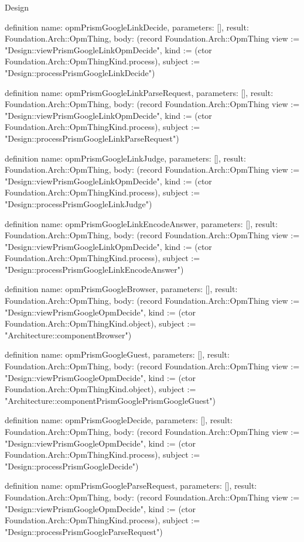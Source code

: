 \begin{lexlean}{Design}
\begin{semanticmodule}
definition{
  name: opmPrismGoogleLinkDecide,
  parameters: [],
  result: Foundation.Arch::OpmThing,
  body: (record Foundation.Arch::OpmThing {view := "Design::viewPrismGoogleLinkOpmDecide", kind := (ctor Foundation.Arch::OpmThingKind.process), subject := "Design::processPrismGoogleLinkDecide"})
}

definition{
  name: opmPrismGoogleLinkParseRequest,
  parameters: [],
  result: Foundation.Arch::OpmThing,
  body: (record Foundation.Arch::OpmThing {view := "Design::viewPrismGoogleLinkOpmDecide", kind := (ctor Foundation.Arch::OpmThingKind.process), subject := "Design::processPrismGoogleLinkParseRequest"})
}

definition{
  name: opmPrismGoogleLinkJudge,
  parameters: [],
  result: Foundation.Arch::OpmThing,
  body: (record Foundation.Arch::OpmThing {view := "Design::viewPrismGoogleLinkOpmDecide", kind := (ctor Foundation.Arch::OpmThingKind.process), subject := "Design::processPrismGoogleLinkJudge"})
}

definition{
  name: opmPrismGoogleLinkEncodeAnswer,
  parameters: [],
  result: Foundation.Arch::OpmThing,
  body: (record Foundation.Arch::OpmThing {view := "Design::viewPrismGoogleLinkOpmDecide", kind := (ctor Foundation.Arch::OpmThingKind.process), subject := "Design::processPrismGoogleLinkEncodeAnswer"})
}

definition{
  name: opmPrismGoogleBrowser,
  parameters: [],
  result: Foundation.Arch::OpmThing,
  body: (record Foundation.Arch::OpmThing {view := "Design::viewPrismGoogleOpmDecide", kind := (ctor Foundation.Arch::OpmThingKind.object), subject := "Architecture::componentBrowser"})
}

definition{
  name: opmPrismGoogleGuest,
  parameters: [],
  result: Foundation.Arch::OpmThing,
  body: (record Foundation.Arch::OpmThing {view := "Design::viewPrismGoogleOpmDecide", kind := (ctor Foundation.Arch::OpmThingKind.object), subject := "Architecture::componentPrismGooglePrismGoogleGuest"})
}

definition{
  name: opmPrismGoogleDecide,
  parameters: [],
  result: Foundation.Arch::OpmThing,
  body: (record Foundation.Arch::OpmThing {view := "Design::viewPrismGoogleOpmDecide", kind := (ctor Foundation.Arch::OpmThingKind.process), subject := "Design::processPrismGoogleDecide"})
}

definition{
  name: opmPrismGoogleParseRequest,
  parameters: [],
  result: Foundation.Arch::OpmThing,
  body: (record Foundation.Arch::OpmThing {view := "Design::viewPrismGoogleOpmDecide", kind := (ctor Foundation.Arch::OpmThingKind.process), subject := "Design::processPrismGoogleParseRequest"})
}


\end{semanticmodule}
\end{lexlean}
